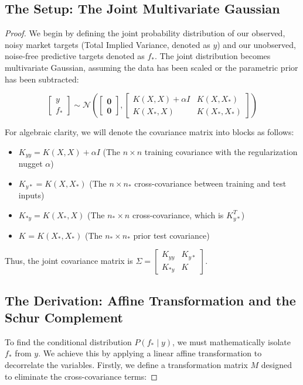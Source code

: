 \documentclass[12pt,oneside]{report}
\theoremstyle{definition}
\theoremstyle{remark}
\begin{document}
\subsection{The Setup: The Joint Multivariate Gaussian}
\begin{proof}
We begin by defining the joint probability distribution of our observed, noisy market targets (Total Implied Variance, denoted as $y$) and our unobserved, noise-free predictive targets denoted as $f_*$. The joint distribution becomes multivariate Gaussian, assuming the data has been scaled or the parametric prior has been subtracted:

$$\begin{bmatrix} y \\ f_* \end{bmatrix} \sim \mathcal{N} \left( \begin{bmatrix} \mathbf{0} \\ \mathbf{0} \end{bmatrix}, \begin{bmatrix} K(X, X) + \alpha I & K(X, X_*) \\ K(X_*, X) & K(X_*, X_*) \end{bmatrix} \right)$$

For algebraic clarity, we will denote the covariance matrix into blocks as follows:

\begin{itemize}
	\item $K_{yy} = K(X, X) + \alpha I$ (The $n \times n$ training covariance with the regularization nugget $\alpha$)
	\item $K_{y*} = K(X, X_*)$ (The $n \times n_*$ cross-covariance between training and test inputs)
	\item $K_{*y} = K(X_*, X)$ (The $n_* \times n$ cross-covariance, which is $K_{y*}^T$)
	\item $K_{} = K(X_*, X_*)$ (The $n_* \times n_*$ prior test covariance)
\end{itemize}

Thus, the joint covariance matrix is $\Sigma = \begin{bmatrix} K_{yy} & K_{y*} \\ K_{*y} & K_{} \end{bmatrix}$.

\subsection{The Derivation: Affine Transformation and the Schur Complement}
To find the conditional distribution $P(f_* \mid y)$, we must mathematically isolate $f_*$ from $y$. We achieve this by applying a linear affine transformation to decorrelate the variables. Firstly, we define a transformation matrix $M$ designed to eliminate the cross-covariance terms:


\end{proof}
\end{document}
